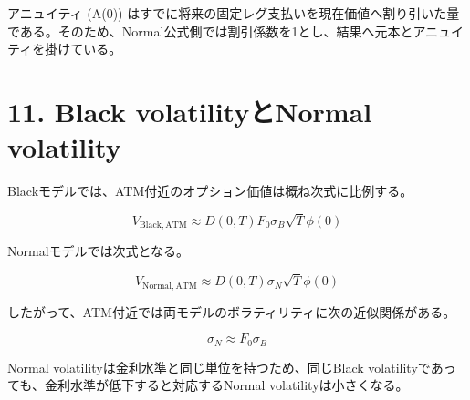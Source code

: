 \documentclass[
  letterpaper,
  DIV=11,
  numbers=noendperiod]{scrreprt}
\begin{document}
アニュイティ (A(0))
はすでに将来の固定レグ支払いを現在価値へ割り引いた量である。そのため、Normal公式側では割引係数を1とし、結果へ元本とアニュイティを掛けている。

\section{11. Black volatilityとNormal
volatility}\label{black-volatilityux3068normal-volatility}

Blackモデルでは、ATM付近のオプション価値は概ね次式に比例する。

\[
V_{\mathrm{Black,ATM}}
\approx
D(0,T)
F_0\sigma_B\sqrt{T}\phi(0)
\]

Normalモデルでは次式となる。

\[
V_{\mathrm{Normal,ATM}}
\approx
D(0,T)
\sigma_N\sqrt{T}\phi(0)
\]

したがって、ATM付近では両モデルのボラティリティに次の近似関係がある。

\[
\sigma_N
\approx
F_0\sigma_B
\]

Normal volatilityは金利水準と同じ単位を持つため、同じBlack
volatilityであっても、金利水準が低下すると対応するNormal
volatilityは小さくなる。
\end{document}
